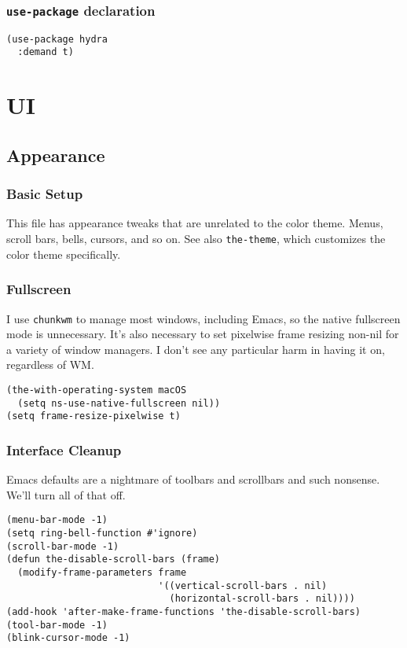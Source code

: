 \documentclass[11pt]{article}
\begin{document}
\subsubsection{\texttt{use-package} declaration}
\label{sec:orgc942cdf}
\begin{verbatim}
(use-package hydra
  :demand t)
\end{verbatim}
\section{UI}
\label{sec:orgdb8a438}
\subsection{Appearance}
\label{sec:org48e7165}
\subsubsection{Basic Setup}
\label{sec:orgeb19d9b}
This file has appearance tweaks that are unrelated to the color
theme. Menus, scroll bars, bells, cursors, and so on. See also
\texttt{the-theme}, which customizes the color theme specifically.

\subsubsection{Fullscreen}
\label{sec:org62eb808}
I use \texttt{chunkwm} to manage most windows, including Emacs, so the native
fullscreen mode is unnecessary. It's also necessary to set pixelwise
frame resizing non-nil for a variety of window managers. I don't see
any particular harm in having it on, regardless of WM.

\begin{verbatim}
(the-with-operating-system macOS
  (setq ns-use-native-fullscreen nil))
(setq frame-resize-pixelwise t)
\end{verbatim}

\subsubsection{Interface Cleanup}
\label{sec:org02de84b}
Emacs defaults are a nightmare of toolbars and scrollbars and such
nonsense. We'll turn all of that off.

\begin{verbatim}
(menu-bar-mode -1)
(setq ring-bell-function #'ignore)
(scroll-bar-mode -1)
(defun the-disable-scroll-bars (frame)
  (modify-frame-parameters frame
                           '((vertical-scroll-bars . nil)
                             (horizontal-scroll-bars . nil))))
(add-hook 'after-make-frame-functions 'the-disable-scroll-bars)
(tool-bar-mode -1)
(blink-cursor-mode -1)
\end{verbatim}
\end{document}
